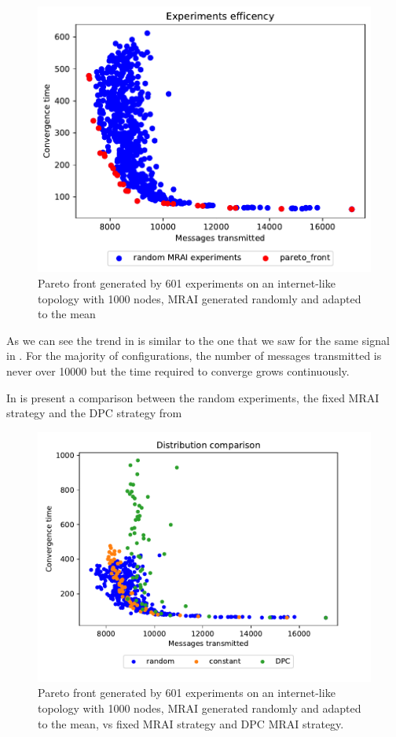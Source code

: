 \begin{figure}[h]
    \centering
    \includegraphics[width=.5\textwidth]{images/internet_like/1000/random.pdf}
	\caption{Pareto front generated by \num{601} experiments on an internet-like
	topology with \num{1000} nodes, \ac{MRAI} generated randomly and adapted to 
	the mean }
    \label{fig:random_pareto_front}
\end{figure}

As we can see the trend in  is similar to the one
that we saw for the same signal in .
For the majority of configurations, the number of messages transmitted is never
over \num{10000} but the time required to converge grows continuously.

In  is present a comparison between the random
experiments, the fixed \ac{MRAI} strategy and the \ac{DPC} strategy from

\begin{figure}[h]
    \centering
    \includegraphics[width=.57\textwidth]{images/internet_like/1000/random_vs_all.pdf}
	\caption{Pareto front generated by \num{601} experiments on an internet-like
	topology with \num{1000} nodes, \ac{MRAI} generated randomly and adapted to 
	the mean, vs fixed \ac{MRAI} strategy and \ac{DPC} \ac{MRAI} strategy.
	}
    \label{fig:pareto_comparison}
\end{figure}

